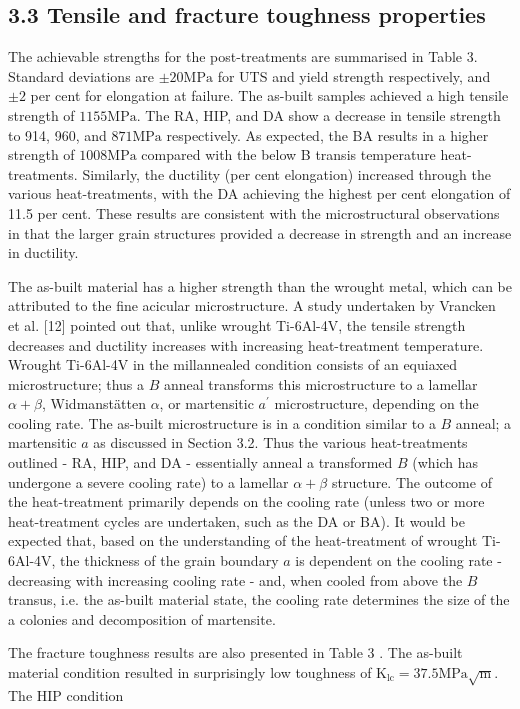 \documentclass[10pt]{article}
\begin{document}
\subsection*{3.3 Tensile and fracture toughness properties}
The achievable strengths for the post-treatments are summarised in Table 3. Standard deviations are $\pm 20 \mathrm{MPa}$ for UTS and yield strength respectively, and $\pm 2$ per cent for elongation at failure. The as-built samples achieved a high tensile strength of $1155 \mathrm{MPa}$. The RA, HIP, and DA show a decrease in tensile strength to 914, 960, and $871 \mathrm{MPa}$ respectively. As expected, the BA results in a higher strength of $1008 \mathrm{MPa}$ compared with the below B transis temperature heat-treatments. Similarly, the ductility (per cent elongation) increased through the various heat-treatments, with the DA achieving the highest per cent elongation of 11.5 per cent. These results are consistent with the microstructural observations in that the larger grain structures provided a decrease in strength and an increase in ductility.

The as-built material has a higher strength than the wrought metal, which can be attributed to the fine acicular microstructure. A study undertaken by Vrancken et al. [12] pointed out that, unlike wrought Ti-6Al-4V, the tensile strength decreases and ductility increases with increasing heat-treatment temperature. Wrought Ti-6Al-4V in the millannealed condition consists of an equiaxed microstructure; thus a $B$ anneal transforms this microstructure to a lamellar $\alpha+\beta$, Widmanstätten $\alpha$, or martensitic $a^{\prime}$ microstructure, depending on the cooling rate. The as-built microstructure is in a condition similar to a $B$ anneal; a martensitic $a$ as discussed in Section 3.2. Thus the various heat-treatments outlined - RA, HIP, and DA - essentially anneal a transformed $B$ (which has undergone a severe cooling rate) to a lamellar $\alpha+\beta$ structure. The outcome of the heat-treatment primarily depends on the cooling rate (unless two or more heat-treatment cycles are undertaken, such as the DA or BA). It would be expected that, based on the understanding of the heat-treatment of wrought Ti-6Al-4V, the thickness of the grain boundary $a$ is dependent on the cooling rate - decreasing with increasing cooling rate - and, when cooled from above the $B$ transus, i.e. the as-built material state, the cooling rate determines the size of the a colonies and decomposition of martensite.

The fracture toughness results are also presented in Table 3 . The as-built material condition resulted in surprisingly low toughness of $\mathrm{K}_{\mathrm{lc}}=37.5 \mathrm{MPa} \sqrt{\mathrm{m}}$. The HIP condition
\end{document}
